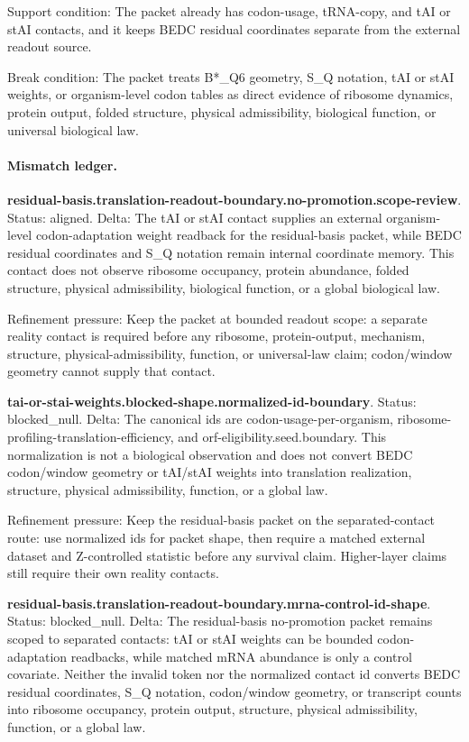 Support condition: The packet already has codon-usage, tRNA-copy, and tAI or stAI contacts, and it keeps BEDC residual coordinates separate from the external readout source.

Break condition: The packet treats B*\_Q6 geometry, S\_Q notation, tAI or stAI weights, or organism-level codon tables as direct evidence of ribosome dynamics, protein output, folded structure, physical admissibility, biological function, or universal biological law.

\paragraph{Mismatch ledger.}
\textbf{residual-basis.translation-readout-boundary.no-promotion.scope-review}. Status: aligned. Delta: The tAI or stAI contact supplies an external organism-level codon-adaptation weight readback for the residual-basis packet, while BEDC residual coordinates and S\_Q notation remain internal coordinate memory. This contact does not observe ribosome occupancy, protein abundance, folded structure, physical admissibility, biological function, or a global biological law.

Refinement pressure: Keep the packet at bounded readout scope: a separate reality contact is required before any ribosome, protein-output, mechanism, structure, physical-admissibility, function, or universal-law claim; codon/window geometry cannot supply that contact.

\textbf{tai-or-stai-weights.blocked-shape.normalized-id-boundary}. Status: blocked\_null. Delta: The canonical ids are codon-usage-per-organism, ribosome-profiling-translation-efficiency, and orf-eligibility.seed.boundary. This normalization is not a biological observation and does not convert BEDC codon/window geometry or tAI/stAI weights into translation realization, structure, physical admissibility, function, or a global law.

Refinement pressure: Keep the residual-basis packet on the separated-contact route: use normalized ids for packet shape, then require a matched external dataset and Z-controlled statistic before any survival claim. Higher-layer claims still require their own reality contacts.

\textbf{residual-basis.translation-readout-boundary.mrna-control-id-shape}. Status: blocked\_null. Delta: The residual-basis no-promotion packet remains scoped to separated contacts: tAI or stAI weights can be bounded codon-adaptation readbacks, while matched mRNA abundance is only a control covariate. Neither the invalid token nor the normalized contact id converts BEDC residual coordinates, S\_Q notation, codon/window geometry, or transcript counts into ribosome occupancy, protein output, structure, physical admissibility, function, or a global law.

